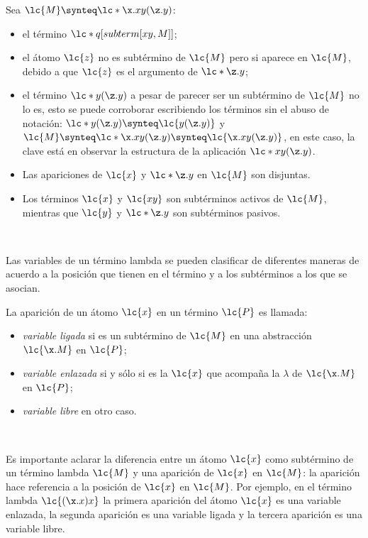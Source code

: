 \begin{ejemplo} Sea \(\lc{M}\synteq \lc*{\x.x y(\z.y)}\):
  \begin{itemize}
  \item el término \(\lc*{q[subterm[x y, M]]}\);
  \item el átomo \(\lc{z}\) no es subtérmino de \(\lc{M}\) pero si aparece en \(\lc{M}\), debido a que \(\lc{z}\) es el argumento de \(\lc*{\z.y}\);
  \item el término \(\lc*{y(\z.y)}\) a pesar de parecer ser un subtérmino de \(\lc{M}\) no lo es, esto se puede corroborar escribiendo los términos sin el abuso de notación: \(\lc*{y(\z.y)} \synteq \lc{y(\z.y)}\) y \(\lc{M} \synteq \lc*{\x.x y(\z.y)} \synteq \lc{\x.x y(\z.y)}\), en este caso, la clave está en observar la estructura de la aplicación \(\lc*{x y(\z.y)}\).
  \item Las apariciones de \(\lc{x}\) y \(\lc*{\z.y}\) en \(\lc{M}\) son disjuntas.
  \item Los términos \(\lc{x}\) y \(\lc{x y}\) son subtérminos activos de \(\lc{M}\), mientras que \(\lc{y}\) y \(\lc*{\z.y}\) son subtérminos pasivos.
  \end{itemize}
\end{ejemplo} \

Las variables de un término lambda se pueden clasificar de diferentes maneras de acuerdo a la posición que tienen en el término y a los subtérminos a los que se asocian. \\

\begin{defi} La aparición de un átomo \(\lc{x}\) en un término \(\lc{P}\) es llamada: \
  \label{definicion:clasesvariables}
  \begin{itemize}
  \item \emph{variable ligada} si es un subtérmino de \(\lc{M}\) en una abstracción \(\lc{\x.M}\) en \(\lc{P}\);
  \item \emph{variable enlazada} si y sólo si es la \(\lc{x}\) que acompaña la \(\lambda\) de \(\lc{\x.M}\) en \(\lc{P}\);
  \item \emph{variable libre} en otro caso.
  \end{itemize}
\end{defi} \

Es importante aclarar la diferencia entre un átomo \(\lc{x}\) como subtérmino de un término lambda \(\lc{M}\) y una aparición de \(\lc{x}\) en \(\lc{M}\): la aparición hace referencia a la posición de \(\lc{x}\) en \(\lc{M}\). Por ejemplo, en el término lambda \(\lc{(\x.x)x}\) la primera aparición del átomo \(\lc{x}\) es una variable enlazada, la segunda aparición es una variable ligada y la tercera aparición es una variable libre. \\

